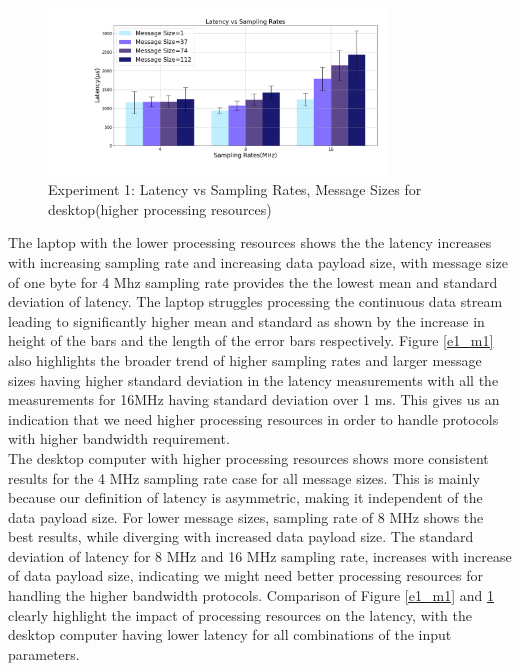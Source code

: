 \begin{figure}[h!]
\centering
\includegraphics[width=0.8\textwidth]{Thesis/Figure/E1_M2.png}
\caption{Experiment 1: Latency vs Sampling Rates, Message Sizes for desktop(higher processing resources)}
\label{e1_m2}
\end{figure}


The laptop with the lower processing resources shows the the latency increases with increasing sampling rate and increasing data payload size, with message size of one byte for 4 Mhz sampling rate provides the the lowest mean and standard deviation of latency.
The laptop struggles processing the continuous data stream leading to significantly higher mean and standard as shown by the increase in height of the bars and the length of the error bars respectively.
Figure \ref{e1_m1} also highlights the broader trend of higher sampling rates and larger message sizes having higher standard deviation in the latency measurements with all the measurements for 16MHz having standard deviation over 1 ms.
This gives us an indication that we need higher processing resources in order to handle protocols with higher bandwidth requirement.\\

The desktop computer with higher processing resources shows more consistent results for the 4 MHz sampling rate case for all  message sizes.
This is mainly because our definition of latency is asymmetric, making it independent of the data payload size.
For lower message sizes, sampling rate of 8 MHz shows the best results, while diverging with increased data payload size.
The standard deviation of latency for 8 MHz and 16 MHz sampling rate, increases with increase of data payload size, indicating we might need better processing resources for handling the higher bandwidth protocols.
Comparison of Figure \ref{e1_m1} and \ref{e1_m2} clearly highlight the impact of processing resources on the latency, with the desktop computer having lower latency for all combinations of the input parameters.\\

